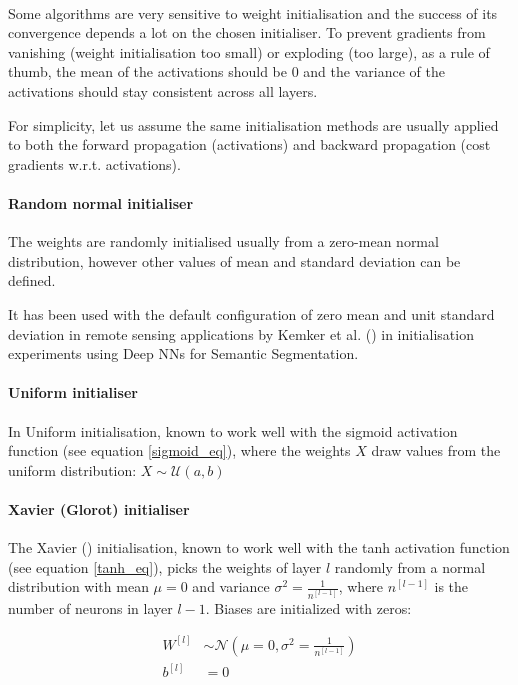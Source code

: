 \paragraph{}
Some algorithms are very sensitive to weight initialisation and the success of its convergence depends a lot on the chosen initialiser. To prevent gradients from vanishing (weight initialisation too small) or exploding (too large), as a rule of thumb, the mean of the activations should be $0$ and the variance of the activations should stay consistent across all layers.

For simplicity, let us assume the same initialisation methods are usually applied to both the forward propagation (activations) and backward propagation (cost gradients \gls{w.r.t.} activations).

\paragraph{Random normal initialiser} The weights are randomly initialised usually from a zero-mean normal distribution, however other values of mean and standard deviation can be defined. 

It has been used with the default configuration of zero mean and unit standard deviation in remote sensing applications by Kemker et al. (\cite{kemker2018algorithms}) in initialisation experiments using Deep \gls{NN}s for Semantic Segmentation.

\paragraph{Uniform initialiser} In Uniform initialisation, known to work well with the sigmoid activation function (see equation \ref{sigmoid_eq}), where the weights $X$ draw values from the uniform distribution:
$X \sim \mathcal{U}(a,b)$
\paragraph{Xavier (Glorot) initialiser} The Xavier (\cite{pmlrv9glorot10a}) initialisation, known to work well with the tanh activation function (see equation \ref{tanh_eq}), picks the weights of layer $l$ randomly from a normal distribution with mean $\mu = 0$ and variance $\sigma^2 = \frac{1}{n^{[l-1]}}$, where $n^{[l-1]}$ is the number of neurons in layer $l-1$. Biases are initialized with zeros:

\begin{equation} 
\begin{aligned}W^{[l]} &\sim \mathcal{N}(\mu=0,\sigma^2 = \frac{1}{n^{[l-1]}})\\ b^{[l]} &= 0\end{aligned}
\end{equation}

